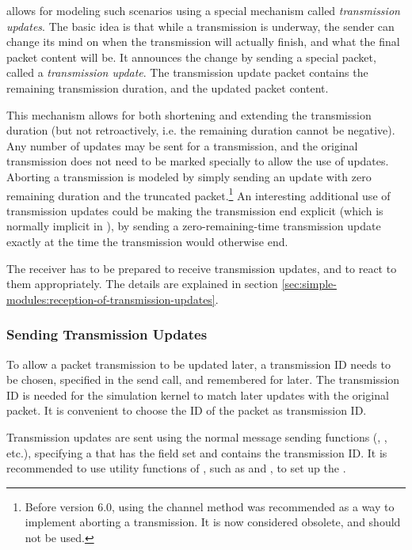 {\omnetpp} allows for modeling such scenarios using a special mechanism called
\textit{transmission updates}. The basic idea is that while a transmission is
underway, the sender can change its mind on when the transmission will actually
finish, and what the final packet content will be. It announces the change by
sending a special packet, called a \textit{transmission update}. The
transmission update packet contains the remaining transmission duration, and the
updated packet content.

This mechanism allows for both shortening and extending the transmission
duration (but not retroactively, i.e. the remaining duration cannot be
negative). Any number of updates may be sent for a transmission, and the
original transmission does not need to be marked specially to allow the use of
updates. Aborting a transmission is modeled by simply sending an update with
zero remaining duration and the truncated packet.\footnote{Before {\omnetpp}
version 6.0, using the  channel method was
recommended as a way to implement aborting a transmission. It is now considered
obsolete, and should not be used.} An interesting additional use of transmission
updates could be making the transmission end explicit (which is normally
implicit in {\omnetpp}), by sending a zero-remaining-time transmission update
exactly at the time the transmission would otherwise end.

\begin{note}
  The receiver has to be prepared to receive transmission updates, and to react
  to them appropriately. The details are explained in section
  \ref{sec:simple-modules:reception-of-transmission-updates}.
\end{note}


\subsubsection{Sending Transmission Updates}
\label{sec:simple-modules:sending-transmission-updates}

To allow a packet transmission to be updated later, a transmission ID needs to
be chosen, specified in the send call, and remembered for later. The
transmission ID is needed for the simulation kernel to match later updates with
the original packet. It is convenient to choose the ID of the packet as
transmission ID.

Transmission updates are sent using the normal message sending functions
(, , etc.), specifying a 
that has the  field set and contains the transmission ID.
It is recommended to use utility functions of , such as
 and , to set up the .

